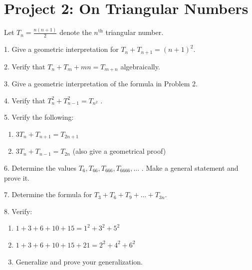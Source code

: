\documentclass[10pt,]{book}
\theoremstyle{plain}
\theoremstyle{definition}
\theoremstyle{definition}
\theoremstyle{definition}
\numberwithin{equation}{chapter}
\begin{document}
\section[{Project 2: On Triangular Numbers}]{Project 2: On Triangular Numbers}\label{exercises-2}
\hypertarget{p-1667}{}%
Let \(T_{n} = \frac{n\left( n + 1 \right)}{2}\) denote the \(n^{\text{th}}\) triangular number.%
\begin{exerciselist}
\item[1.]\hypertarget{exercise-10}{}\hypertarget{p-1668}{}%
Give a geometric interpretation for \(T_{n} + T_{n + 1} = \left( n + 1 \right)^{2}.\)%
\par\smallskip
\item[2.]\hypertarget{exercise-11}{}\hypertarget{p-1669}{}%
Verify that \(T_{n} + T_{m} + mn = T_{m + n}\) algebraically.%
\par\smallskip
\item[3.]\hypertarget{exercise-12}{}\hypertarget{p-1670}{}%
Give a geometric interpretation of the formula in Problem 2.%
\par\smallskip
\item[4.]\hypertarget{exercise-13}{}\hypertarget{p-1671}{}%
Verify that \(T_{n}^{2} + T_{n - 1}^{2} = T_{n^{2}}\) .%
\par\smallskip
\item[5.]\hypertarget{exercise-14}{}\hypertarget{p-1672}{}%
Verify the following: \leavevmode%
\begin{enumerate}[label=(\alph*)]
\item\hypertarget{li-79}{}\hypertarget{p-1673}{}%
\(3T_{n} + T_{n + 1} = T_{2n + 1}\)%
\item\hypertarget{li-80}{}\hypertarget{p-1674}{}%
\(3T_{n} + T_{n - 1} = T_{2n}\) (also give a geometrical proof)%
\end{enumerate}
%
\par\smallskip
\item[6.]\hypertarget{exercise-15}{}\hypertarget{p-1675}{}%
Determine the values \(T_{6},T_{66},T_{666},T_{6666},\ldots\) . Make a general statement and prove it.%
\par\smallskip
\item[7.]\hypertarget{exercise-16}{}\hypertarget{p-1676}{}%
Determine the formula for \(T_{3} + T_{6} + T_{9} + \ldots + T_{3n}.\)%
\par\smallskip
\item[8.]\hypertarget{exercise-17}{}\hypertarget{p-1677}{}%
Verify: \leavevmode%
\begin{enumerate}[label=(\alph*)]
\item\hypertarget{li-81}{}\hypertarget{p-1678}{}%
\(1 + 3 + 6 + 10 + 15 = 1^{2} + 3^{2} + 5^{2}\)%
\item\hypertarget{li-82}{}\hypertarget{p-1679}{}%
\(1 + 3 + 6 + 10 + 15 + 21 = 2^{2} + 4^{2} + 6^{2}\)%
\item\hypertarget{li-83}{}\hypertarget{p-1680}{}%
Generalize and prove your generalization.%
\end{enumerate}
%
\par\smallskip
\end{exerciselist}
\typeout{************************************************}
\typeout{************************************************}
\end{document}
